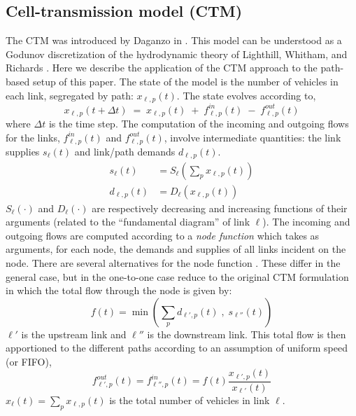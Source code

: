 \subsection{Cell-transmission model (CTM)}
The CTM was introduced by Daganzo in \cite{daganzo1995cell}. This model can be understood as a Godunov discretization of the hydrodynamic theory of Lighthill, Whitham, and Richards \cite{whitham1955kinematic,richards1956shock}. Here we describe the application of the CTM approach to the path-based setup of this paper. The state of the model is the number of vehicles in each link, segregated by path: $x_{\ell,p}(t)$. The state evolves according to,
\begin{equation}
x_{\ell,p}(t+\Delta t) \;=\; x_{\ell,p}(t) \;+\; f^{in}_{\ell,p}(t) \;-\; f^{out}_{\ell,p}(t)
\end{equation}
where $\Delta t$ is the time step. The computation of the incoming and outgoing flows for the links, $f^{in}_{\ell,p}(t)$ and $f^{out}_{\ell,p}(t)$, involve intermediate quantities: the link supplies $s_\ell(t)$ and link/path demands $d_{\ell,p}(t)$.
\begin{align}
s_\ell(t) &= S_\ell\left(\sum_{p} x_{\ell,p}(t)\right) \\
d_{\ell,p}(t) &= D_\ell(x_{\ell,p}(t))
\end{align}
$S_\ell(\cdot)$ and $D_\ell(\cdot)$ are respectively decreasing and increasing functions of their arguments (related to the ``fundamental diagram'' of link $\ell$). The incoming and outgoing flows are computed according to a \textit{node function} which takes as arguments, for each node, the demands and supplies of all links incident on the node. There are several alternatives for the node function \cite{wright2017node,tampere2011generic}. These differ in the general case, but in the one-to-one case reduce to the original CTM formulation in which the total flow through the node is given by:
\begin{equation}
\label{eq:f}
f(t) = \min\left( \sum_{p}d_{\ell',p}(t) \; , \; s_{\ell''}(t)  \right)
\end{equation}
$\ell'$ is the upstream link and $\ell''$ is the downstream link. This total flow is then apportioned to the different paths according to an assumption of uniform speed (or FIFO),
\begin{equation}
f^{out}_{\ell',p}(t) = f^{in}_{\ell'',p}(t) = f(t)\frac{x_{\ell',p}(t)}{x_{\ell'}(t)}
\end{equation}
$x_{\ell}(t) = \sum_{p} x_{\ell,p}(t)$ is the total number of vehicles in link $\ell$.

